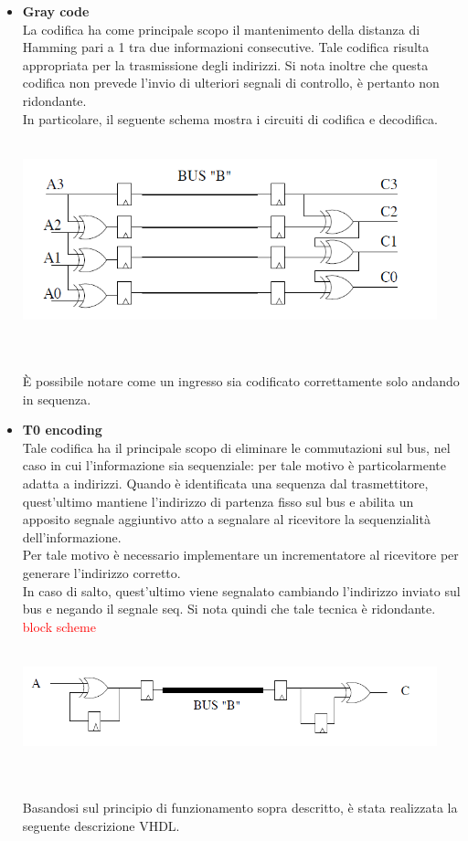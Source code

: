 \documentclass[11pt,  english, makeidx, a4paper, titlepage, oneside]{book}
\newenvironment{listato}{\footnotesize} {\normalsize }
\begin{document}
\begin{itemize}
\\\\
\item \textbf{Gray code}
\\
La codifica ha come principale scopo il mantenimento della distanza di Hamming pari a 1 tra due informazioni consecutive. Tale codifica risulta appropriata per la trasmissione degli indirizzi. Si nota inoltre che questa codifica non prevede l'invio di ulteriori segnali di controllo, è pertanto non ridondante.
\\
In particolare, il seguente schema mostra i circuiti di codifica e decodifica.
\\\\
\centerline{\includegraphics[width=12cm]{./img/Lab_4/gray.png}}
\\\\
È possibile notare come un ingresso sia codificato correttamente solo andando in sequenza.
\item \textbf{T0 encoding}
\\
Tale codifica ha il principale scopo di eliminare le commutazioni sul bus, nel caso in cui l'informazione sia sequenziale: per tale motivo è particolarmente adatta a indirizzi. Quando è identificata una sequenza dal trasmettitore, quest'ultimo mantiene l'indirizzo di partenza fisso sul bus e abilita un apposito segnale aggiuntivo atto a segnalare al ricevitore la sequenzialità dell'informazione.
\\
Per tale motivo è necessario implementare un incrementatore al ricevitore per generare l'indirizzo corretto.
\\
In caso di salto, quest'ultimo viene segnalato cambiando l'indirizzo inviato sul bus e negando il segnale seq.
Si nota quindi che tale tecnica è ridondante.
\\
\textcolor{red}{block scheme}
\\\\
\centerline{\includegraphics[width=12cm]{./img/Lab_4/tran_based.png}}
\\\\
Basandosi sul principio di funzionamento sopra descritto, è stata realizzata la seguente descrizione VHDL.
\begin{center}
\begin{listato}
	\centerline{}
\end{listato}
\end{center}
\end{itemize}
\end{document}
